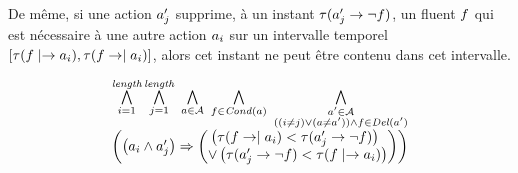De même, si une action $a'_{j}$ supprime, à un instant $\tau(a'_{j}\rightarrow\neg f)$, un fluent $f$ qui est nécessaire à une autre action $a_{i}$ sur un intervalle temporel $[\tau(f\mid\rightarrow a_{i}), \tau(f\rightarrow\mid a_{i})]$, alors cet instant ne peut être contenu dans cet intervalle.

\begin{small}
\[
\begin{matrix}
\BigforallTwo{i=1}{\length}\BigforallTwo{j=1}{\length}%
~\Bigforall{\substack{\a\in \A}}~\Bigforall{\substack{\f\in \cond{\a}}}~\Bigforall{\substack{\b\in \A\\((i \neq j) \vee (\a \neq \b)) \wedge \f \in \del{\b}}}\hfill\\
\left(\left(\a_{i} \wedge \b_{j}\right) \Rightarrow \begin{pmatrix}\left(\tau(\f\rightarrow\mid\a_{i}) < \tau(\b_{j}\rightarrow \neg \f)\right)\hfill\\
 \vee \left(\tau(\b_{j}\rightarrow \neg \f) < \tau(\f\mid\rightarrow\a_{i})\right)\end{pmatrix}\right)%
\end{matrix}
\]
\end{small}


